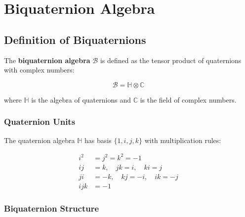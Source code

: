 

\section{Biquaternion Algebra}
\label{sec:canonical:biquaternion_algebra}

\subsection{Definition of Biquaternions}

The \textbf{biquaternion algebra} $\mathcal{B}$ is defined as the tensor product of quaternions with complex numbers:

\begin{equation}
\label{eq:canonical:biquat_def}
\mathcal{B} = \mathbb{H} \otimes \mathbb{C}
\end{equation}

where $\mathbb{H}$ is the algebra of quaternions and $\mathbb{C}$ is the field of complex numbers.

\subsubsection{Quaternion Units}

The quaternion algebra $\mathbb{H}$ has basis $\{1, i, j, k\}$ with multiplication rules:

\begin{align}
\label{eq:canonical:quaternion_mult}
i^2 &= j^2 = k^2 = -1 \\
ij &= k, \quad jk = i, \quad ki = j \\
ji &= -k, \quad kj = -i, \quad ik = -j \\
ijk &= -1
\end{align}

\subsubsection{Biquaternion Structure}

